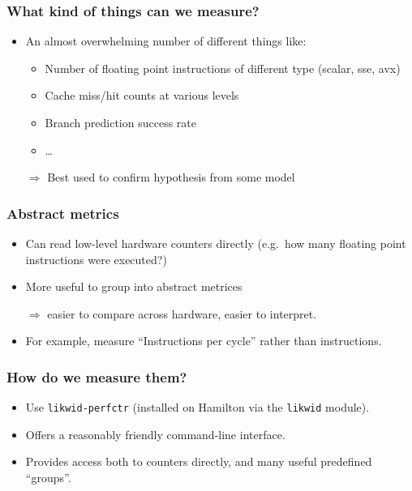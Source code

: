 \documentclass[presentation,aspectratio=43,10pt]{beamer}
\begin{document}
\begin{frame}
  \frametitle{What kind of things can we measure?}
  \begin{itemize}
  \item An almost overwhelming number of different things like:
    \begin{itemize}
    \item Number of floating point instructions of different type
      (scalar, sse, avx)
    \item Cache miss/hit counts at various levels
    \item Branch prediction success rate
    \item \dots
    \end{itemize}
  \item[$\Rightarrow$] Best used to confirm hypothesis from some model
  \end{itemize}
\end{frame}

\begin{frame}
  \frametitle{Abstract metrics}
  \begin{itemize}
  \item Can read low-level hardware counters directly (e.g.~how many
    floating point instructions were executed?)
  \item More useful to group into abstract metrices
  \item[$\Rightarrow$] easier to compare across hardware, easier to
    interpret.
  \item For example, measure ``Instructions per cycle'' rather than
    instructions.
  \end{itemize}
\end{frame}

\begin{frame}
  \frametitle{How do we measure them?}
  \begin{itemize}
  \item Use \texttt{likwid-perfctr} (installed on Hamilton via the
    \texttt{likwid} module).
  \item Offers a reasonably friendly command-line interface.
  \item Provides access both to counters directly, and many useful
    predefined ``groups''.
  \end{itemize}
\end{frame}
\end{document}
